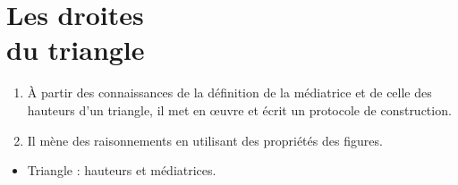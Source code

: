 \themaE
\graphicspath{{../../S28_Les_droites_du_triangle/Images/}}

\chapter{Les droites\\du triangle}
\label{S28}


\begin{autoeval}
   \small
   \begin{enumerate}
      \item À partir des connaissances de la définition de la médiatrice et de celle  des hauteurs d’un triangle, il met en œuvre et écrit un protocole de construction.
      \item Il mène des raisonnements en utilisant des propriétés des figures.
   \end{enumerate}
\end{autoeval}

\begin{prerequis}
   \begin{itemize}
      \item Triangle : hauteurs et médiatrices.
   \end{itemize}
\end{prerequis}

\vfill

